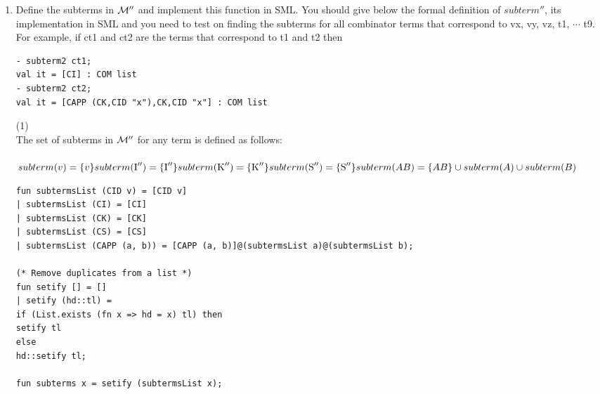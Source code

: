 \documentclass[11pt]{article}
\begin{document}
\begin{enumerate}
\pagebreak	
\item
  Define the subterms in ${\cal M}''$ and implement this function in SML.
  You should give below the formal definition of $subterm''$, its implementation   in SML and you need to test on finding the subterms for all combinator terms that correspond to  vx, vy, vz, t1, $\cdots$ t9.  For example, if ct1 and ct2  are the terms that correspond to t1 and t2 then
\begin{verbatim}
- subterm2 ct1;
val it = [CI] : COM list
- subterm2 ct2;
val it = [CAPP (CK,CID "x"),CK,CID "x"] : COM list
\end{verbatim}
 \hfill{(1)}\\ %
The set of subterms in ${\cal M}''$ for any term is defined as follows:\\ \\
$subterm(v) = \{v\}\\
subterm(\mbox{I}'') = \{\mbox{I}''\}\\
subterm(\mbox{K}'') = \{\mbox{K}''\}\\
subterm(\mbox{S}'') = \{\mbox{S}''\}\\
subterm(AB) = \{AB\} \cup subterm(A) \cup subterm(B) $
\begin{verbatim}
fun subtermsList (CID v) = [CID v]
| subtermsList (CI) = [CI]
| subtermsList (CK) = [CK]
| subtermsList (CS) = [CS]
| subtermsList (CAPP (a, b)) = [CAPP (a, b)]@(subtermsList a)@(subtermsList b);

(* Remove duplicates from a list *)
fun setify [] = []
| setify (hd::tl) = 
if (List.exists (fn x => hd = x) tl) then
setify tl
else
hd::setify tl;

fun subterms x = setify (subtermsList x);

\end{verbatim}


\end{enumerate}
\end{document}
